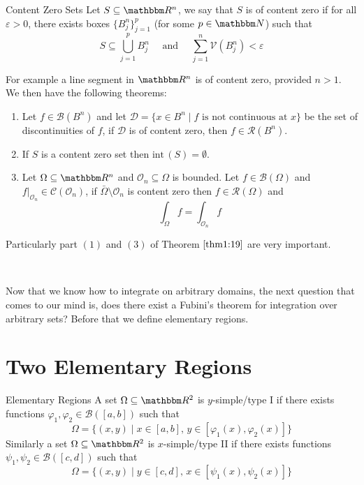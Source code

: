 \documentclass[../Analysis-3.tex]{subfiles}
\begin{document}
\begin{Def}{Content Zero Sets}{}
    Let $S \subseteq \R^n$, we say that $S$ is of content zero if for all $\varepsilon > 0$, there exists boxes $\{ B_j^n \}_{j=1}^p$ (for some $p \in \N$) such that
    \[
        S \subseteq \bigcup_{j=1}^p B_j^n \quad \mbox{ and } \quad \sum_{j=1}^n \mathcal{V}(B^n_j) < \varepsilon
    \]
\end{Def}

For example a line segment in $\R^n$ is of content zero, provided $n > 1$. We then have the following theorems:

\begin{Thm}{}{}\label{thm1:19}
    \begin{enumerate}
        \item Let $f \in \mathscr{B}(B^n)$ and let $\mathcal{D} = \{ x \in B^n \mid f \mbox{ is not continuous at } x \}$ be the set of discontinuities of $f$, if $\mathcal{D}$ is of content zero, then $f \in \mathscr{R}(B^n)$.

        \item If $S$ is a content zero set then $\mathrm{int}\,(S) = \emptyset$.

        \item Let $\Omega \subseteq \R^n$ and $\mathcal{O}_n \subseteq \Omega$ is bounded. Let $f \in \mathscr{B}(\Omega)$ and $f\vert_{\mathcal{O}_n} \in \mathscr{C}(\mathcal{O}_n)$, if $\bar{\Omega}\setminus \mathcal{O}_n$ is content zero then $f \in \mathscr{R}(\Omega)$ and
              \[
                  \int_{\Omega} f = \int_{\mathcal{O}_n} f
              \]
    \end{enumerate}
\end{Thm}
Particularly part $(1)$ and $(3)$ of Theorem $\ref{thm1:19}$ are very important.

\

Now that we know how to integrate on arbitrary domains, the next question that comes to our mind is, does there exist a Fubini's theorem for integration over arbitrary sets? Before that we define elementary regions.

\section{Two Elementary Regions}

\begin{Def}{Elementary Regions}{}
    A set $\Omega \subseteq \R^2$ is $y$-simple/type I if there exists functions $\varphi_1, \varphi_2 \in \mathscr{B}([a,b])$ such that
    \[
        \Omega = \{ (x,y) \mid x \in [a,b], \, y \in [\varphi_1(x), \varphi_2(x)] \}
    \]
    Similarly a set $\Omega \subseteq \R^2$ is $x$-simple/type II if there exists functions $\psi_1, \psi_2 \in \mathscr{B}([c,d])$ such that
    \[
        \Omega = \{ (x,y) \mid y \in [c,d], \, x \in [ \psi_1(x), \psi_2(x) ] \}
    \]
\end{Def}
\end{document}

